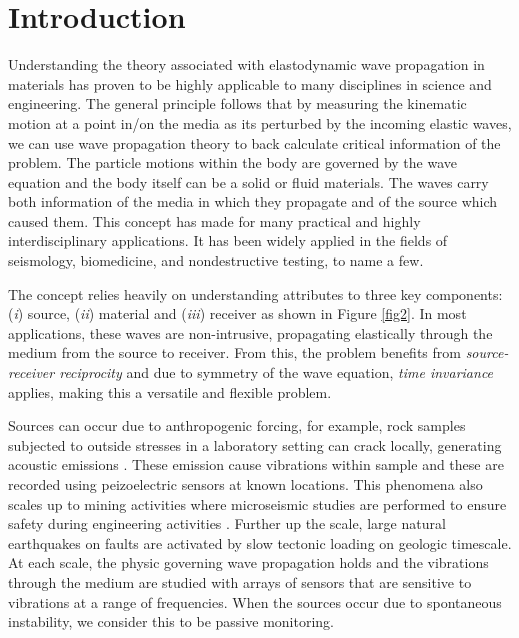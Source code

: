 \documentclass[preprint,3p, 11pt,authoryear]{elsarticle}
\begin{document}
\doublespacing
\linenumbers
\clearpage
\section{Introduction}
\label{int}

Understanding the theory associated with elastodynamic wave propagation in materials has proven to be highly applicable to many disciplines in science and engineering. The general principle follows that by measuring the kinematic motion at a point in/on the media as its perturbed by the incoming elastic waves, we can use wave propagation theory to back calculate critical information of the problem. The particle motions within the body are governed by the wave equation and the body itself can be a solid or fluid materials. The waves carry both information of the media in which they propagate and of the source which caused them. This concept has made for many practical and highly interdisciplinary applications. It has been widely applied in the fields of seismology, biomedicine, and nondestructive testing, to name a few.

The concept relies heavily on understanding attributes to three key components: (\textit{i}) source, (\textit{ii}) material and (\textit{iii}) receiver as shown in Figure \ref{fig2}. In most applications, these waves are non-intrusive, propagating elastically through the medium from the source to receiver. From this, the problem benefits from \textit{source-receiver reciprocity} and due to symmetry of the wave equation, \textit{time invariance} applies, making this a versatile and flexible problem.  

Sources can occur due to anthropogenic forcing, for example, rock samples subjected to outside stresses in a laboratory setting can crack locally, generating acoustic emissions \citep[e.g.][]{Lei2014, Moradian2016}. These emission cause vibrations within sample and these are recorded using peizoelectric sensors at known locations. This phenomena also scales up to mining activities where microseismic studies are performed to ensure safety during engineering activities \citep[e.g.][]{Manthei2018}. Further up the scale, large natural earthquakes on faults are activated by slow tectonic loading on geologic timescale. At each scale, the physic governing wave propagation holds and the vibrations through the medium are studied with arrays of sensors that are sensitive to vibrations at a range of frequencies. When the sources occur due to spontaneous instability, we consider this to be passive monitoring.
\end{document}
